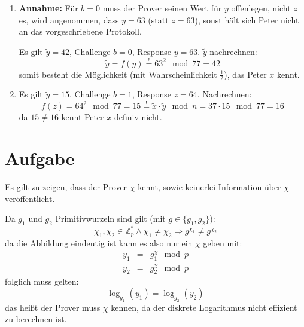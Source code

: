 \documentclass[DIN, pagenumber=false, fontsize=11pt, parskip=half]{scrartcl}
\begin{document}
    \begin{enumerate}[label=\alph*)]
        \item 
            \textbf{Annahme:} Für $b=0$ muss der Prover seinen Wert für $y$ offenlegen,
            nicht $z$ es, wird angenommen, dass $y=63$ (statt $z=63$), sonst hält sich
            Peter nicht an das vorgeschriebene Protokoll.

            Es gilt $\tilde{y}=42$, Challenge $b=0$, Response $y=63$.
            $\tilde{y}$ nachrechnen:
            \begin{equation}
                \tilde{y} = f(y) \stackrel{!}{=} 63^2 \mod 77 = 42
            \end{equation}
            somit besteht die Möglichkeit (mit Wahrscheinlichkeit $\frac{1}{2}$), das
            Peter $x$ kennt.
        \item Es gilt $\tilde{y}=15$, Challenge $b=1$, Response $z=64$.
            Nachrechnen:
            \begin{equation}
                f(z) = 64^2 \mod 77 = 15 \stackrel{!}{=} \tilde{x} \cdot \tilde{y} \mod n
                    = 37 \cdot 15 \mod 77 = 16
            \end{equation}
            da $15 \neq 16$ kennt Peter $x$ definiv nicht.
    \end{enumerate}

    \section{Aufgabe}
    Es gilt zu zeigen, dass der Prover $\chi$ kennt, sowie keinerlei Information
    über $\chi$ veröffentlicht.

    Da $g_1$ und $g_2$ Primitivwurzeln sind gilt (mit $g \in \{g_1, g_2\}$):
    \begin{equation}
        \chi_1, \chi_2 \in \mathbb{Z}^*_p \land \chi_1 \neq \chi_2 \Rightarrow 
            g^{\chi_1} \neq g^{\chi_2}
    \end{equation}
    da die Abbildung eindeutig ist kann es also nur ein $\chi$ geben mit:
    \begin{eqnarray}
        y_1 &=& g_1^\chi \mod p \\
        y_2 &=& g_2^\chi \mod p 
    \end{eqnarray}
    folglich muss gelten:
    \begin{equation}
        \log_{g_1}(y_1) = \log_{g_2}(y_2)
    \end{equation}
    das heißt der Prover muss $\chi$ kennen, da der diskrete Logarithmus nicht effizient
    zu berechnen ist.
\end{document}
